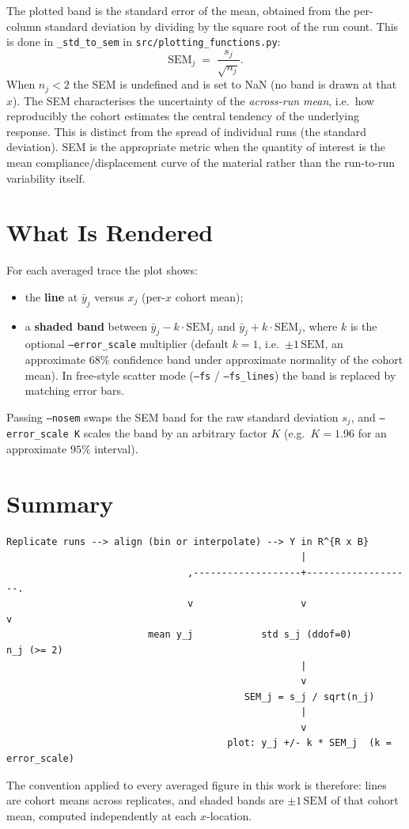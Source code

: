 The plotted band is the standard error of the mean, obtained from the per-column
standard deviation by dividing by the square root of the run count. This is
done in \texttt{\_std\_to\_sem} in \texttt{src/plotting\_functions.py}:
%
\begin{equation}
  \mathrm{SEM}_j \;=\; \frac{s_j}{\sqrt{n_j}}.
  \label{eq:sem}
\end{equation}
%
When $n_j < 2$ the SEM is undefined and is set to NaN (no band is drawn at that
$x$). The SEM characterises the uncertainty of the \emph{across-run mean},
i.e.\ how reproducibly the cohort estimates the central tendency of the
underlying response. This is distinct from the spread of individual runs
(the standard deviation). SEM is the appropriate metric when the quantity of
interest is the mean compliance/displacement curve of the material rather than
the run-to-run variability itself.

\section{What Is Rendered}
\label{sec:err-render}

For each averaged trace the plot shows:
%
\begin{itemize}
  \item the \textbf{line} at $\bar{y}_j$ versus $x_j$ (per-$x$ cohort mean);
  \item a \textbf{shaded band} between
        $\bar{y}_j - k \cdot \mathrm{SEM}_j$ and
        $\bar{y}_j + k \cdot \mathrm{SEM}_j$, where $k$ is the optional
        \texttt{--error\_scale} multiplier
        (default $k = 1$, i.e.\ $\pm 1\,\mathrm{SEM}$, an approximate $68\%$
        confidence band under approximate normality of the cohort mean).
        In free-style scatter mode (\texttt{--fs} / \texttt{--fs\_lines}) the
        band is replaced by matching error bars.
\end{itemize}

Passing \texttt{--nosem} swaps the SEM band for the raw standard deviation
$s_j$, and \texttt{--error\_scale K} scales the band by an arbitrary factor
$K$ (e.g.\ $K = 1.96$ for an approximate $95\%$ interval).

\section{Summary}
\label{sec:err-summary}

\begin{verbatim}
Replicate runs --> align (bin or interpolate) --> Y in R^{R x B}
                                                    |
                                ,-------------------+-------------------.
                                v                   v                   v
                         mean y_j            std s_j (ddof=0)        n_j (>= 2)
                                                    |
                                                    v
                                          SEM_j = s_j / sqrt(n_j)
                                                    |
                                                    v
                                       plot: y_j +/- k * SEM_j  (k = error_scale)
\end{verbatim}

The convention applied to every averaged figure in this work is therefore:
lines are cohort means across replicates, and shaded bands are
$\pm 1\,\mathrm{SEM}$ of that cohort mean, computed independently at each
$x$-location.
